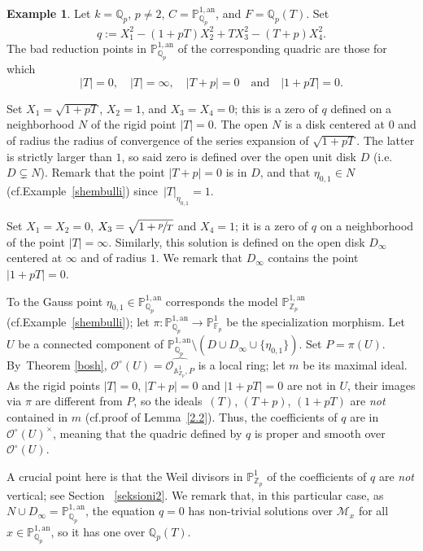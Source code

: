 \documentclass[10pt]{amsart}
\newcommand{\ie}{i.e.}
\newcommand{\cf}{cf.}
\newcommand{\quand}{\quad\text{and}\quad}
\let\backslash\setminus
\theoremstyle{definition}
\newtheorem{ex}[thm]{Example}
\begin{document}
\begin{ex}\label{1.8.3}
Let $k=\mathbb{Q}_p$, $p \neq 2$, $C=\mathbb{P}_{\mathbb{Q}_p}^{1, \mathrm{an}}$, and $F=\mathbb{Q}_p(T)$. Set
\[
q:=X_1^2-(1+pT)X_2^2+TX_3^2 - (T+p)X_4^2.
\]
The bad reduction points in $\mathbb{P}_{\mathbb{Q}_p}^{1, \mathrm{an}}$ of the corresponding quadric are those for which
\[
|T|=0,\quad |T|=\infty,\quad |T+p|=0\quand |1+pT|=0.
\]

Set $X_1=\sqrt{1+pT}$, $X_2=1$, and $X_3=X_4=0$; this is a zero of $q$ defined on a neighborhood $N$ of the rigid point $|T|=0$. The open $N$ is a disk centered at $0$ and of radius the radius of convergence of the series expansion of $\sqrt{1+pT}$. The latter is strictly larger than $1$, so said zero is defined over the open unit disk $D$ (\ie $D \subsetneq N$). Remark that the point $|T+p|=0$ is in $D$, and that $\eta_{0,1} \in N$ (\cf Example~\ref{shembulli}) since~$|T|_{\eta_{0,1}}=1$.

Set $X_1=X_2=0$, $X_3=\sqrt{1+\sfrac{p}{T}}$ and $X_4=1$; it is a zero of $q$ on a neighborhood of the point $|T|=\infty$. Similarly, this solution is defined on the open disk $D_{\infty}$ centered at $\infty$ and of radius $1$. We remark that $D_{\infty}$ contains the point $|1+pT|=0$.

To the Gauss point $\eta_{0,1} \in \mathbb{P}_{\mathbb{Q}_p}^{1, \mathrm{an}}$ corresponds the model $\mathbb{P}_{\mathbb{Z}_p}^{1, \mathrm{an}}$ (\cf Example~\ref{shembulli}); let $\pi: \mathbb{P}_{\mathbb{Q}_p}^{1, \mathrm{an}} \to \mathbb{P}_{\mathbb{F}_p}^{1}$ be the specialization morphism.
Let $U$ be a connected component of $\mathbb{P}_{\mathbb{Q}_p}^{1, \mathrm{an}} \backslash (D \cup D_{\infty} \cup \{\eta_{0,1}\})$. Set $P=\pi(U)$. By~Theorem \ref{bosh}, $\mathcal{O}^{\circ}(U)=\widehat{\mathcal{O}_{\mathbb{A}_{\mathbb{Z}_p}^{1},P}}$ is a local ring; let $m$ be its maximal ideal. As the rigid points $|T|=0$, $|T+p|=0$ and $|1+pT|=0$ are not in $U$, their images via $\pi$ are different from $P$, so the ideals~$(T)$, $(T+p)$, $(1+pT)$ are \emph{not} contained in $m$ (\cf proof of Lemma~\ref{2.2}). Thus, the coefficients of $q$ are in~$\mathcal{O}^{\circ}(U)^{\times}$, meaning that the quadric defined by $q$ is proper and smooth over~$\mathcal{O}^{\circ}(U)$.

A crucial point here is that the Weil divisors in $\mathbb{P}_{\mathbb{Z}_p}^{1}$ of the coefficients of $q$ are \emph{not} vertical; see Section ~\ref{seksioni2}.
We remark that, in this particular case, as $N \cup D_{\infty}=\mathbb{P}_{\mathbb{Q}_p}^{1, \mathrm{an}}$, the equation $q=0$ has non-trivial solutions over $\mathscr{M}_x$ for all $x \in \mathbb{P}_{\mathbb{Q}_p}^{1, \mathrm{an}}$, so it has one over $\mathbb{Q}_p(T)$.
\end{ex}
\end{document}
